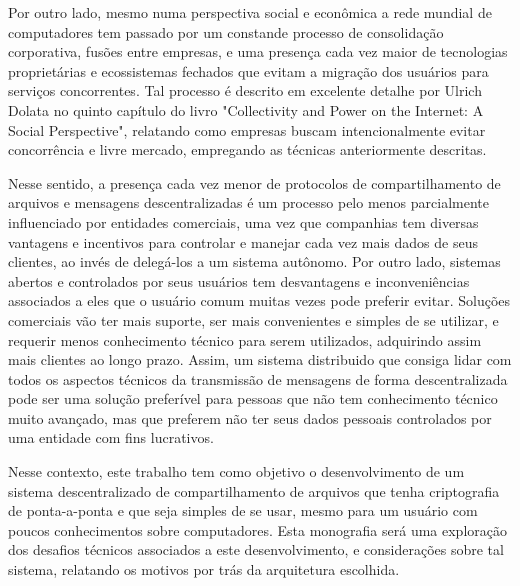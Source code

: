 Por outro lado, mesmo numa perspectiva social e econômica a rede mundial de computadores tem passado por um constande processo de consolidação corporativa, fusões entre empresas, e uma presença cada vez maior de tecnologias proprietárias e ecossistemas fechados que evitam a migração dos usuários para serviços concorrentes. Tal processo é descrito em excelente detalhe por Ulrich Dolata no quinto capítulo do livro "Collectivity and Power on the Internet: A Social Perspective", relatando como empresas buscam intencionalmente evitar concorrência e livre mercado, empregando as técnicas anteriormente descritas. 

Nesse sentido, a presença cada vez menor de protocolos de compartilhamento de arquivos e mensagens descentralizadas é um processo pelo menos parcialmente influenciado por entidades comerciais, uma vez que companhias tem diversas vantagens e incentivos para controlar e manejar cada vez mais dados de seus clientes, ao invés de delegá-los a um sistema autônomo. Por outro lado, sistemas abertos e controlados por seus usuários tem desvantagens e inconveniências associados a eles que o usuário comum muitas vezes pode preferir evitar. Soluções comerciais vão ter mais suporte, ser mais convenientes e simples de se utilizar, e requerir menos conhecimento técnico para serem utilizados, adquirindo assim mais clientes ao longo prazo. Assim, um sistema distribuido que consiga lidar com todos os aspectos técnicos da transmissão de mensagens de forma descentralizada pode ser uma solução preferível para pessoas que não tem conhecimento técnico muito avançado, mas que preferem não ter seus dados pessoais controlados por uma entidade com fins lucrativos. 

Nesse contexto, este trabalho tem como objetivo o desenvolvimento de um sistema descentralizado de compartilhamento de arquivos que tenha criptografia de ponta-a-ponta e que seja simples de se usar, mesmo para um usuário com poucos conhecimentos sobre computadores. Esta monografia será uma exploração dos desafios técnicos associados a este desenvolvimento, e considerações sobre tal sistema, relatando os motivos por trás da arquitetura escolhida. 